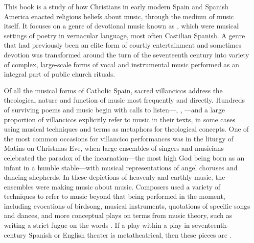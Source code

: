 
This book is a study of how Christians in early modern Spain and Spanish
America enacted religious beliefs about music, through the medium of music
itself.
It focuses on a genre of devotional music known as , which
were musical settings of poetry in vernacular language, most often Castilian
Spanish.
A genre that had previously been an elite form of courtly entertainment and
sometimes devotion was transformed around the turn of the seventeenth century
into variety of complex, large-scale forms of vocal and instrumental music
performed as an integral part of public church rituals.%
    \Autocites
    {Torrente:VC-chapter}
    {Laird:VC}
    {Knighton-Torrente:VCs}
    {Borrego-Marin:Villancico}
    {Illari:Polychoral}
    {CaberoPueyo:PhD}
    {Swadley:VillancicoPhD}
    {ChavezBarcenas:PhD}

Of all the musical forms of Catholic Spain, sacred villancicos address the
theological nature and function of music most frequently and directly.
Hundreds of surviving poems and music begin with calls to
listen---, , ---and a large
proportion of villancicos explicitly refer to music in their texts, in some
cases using musical techniques and terms as metaphors for theological concepts.
One of the most common occasions for villancico performances was in the liturgy
of Matins on Christmas Eve, when large ensembles of singers and musicians
celebrated the paradox of the incarnation---the most high God being born
as an infant in a humble stable---with musical representations of
angel choruses and dancing shepherds.
In these depictions of heavenly and earthly music, the ensembles were making
music about music.
Composers used a variety of techniques to refer to music beyond that being
performed in the moment, including evocations of birdsong, musical instruments,
quotations of specific songs and dances, and more conceptual plays on terms
from music theory, such as writing a strict fugue on the words
.
If a play within a play in seventeenth-century Spanish or English theater is
metatheatrical, then these pieces are .


